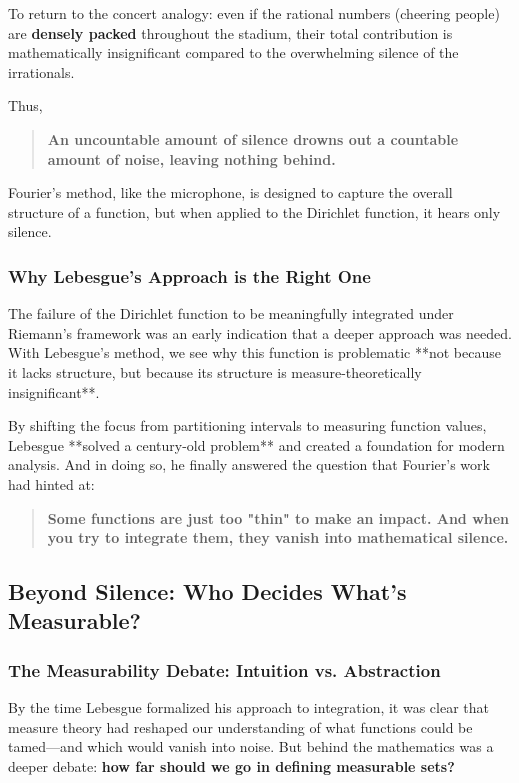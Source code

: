 To return to the concert analogy: even if the rational numbers (cheering people) are \textbf{densely packed} throughout the stadium, their total contribution is mathematically insignificant compared to the overwhelming silence of the irrationals.

Thus,  

\begin{quote}
\textbf{An uncountable amount of silence drowns out a countable amount of noise, leaving nothing behind.}  
\end{quote}

Fourier’s method, like the microphone, is designed to capture the overall structure of a function, but when applied to the Dirichlet function, it hears only silence.



\subsubsection{Why Lebesgue’s Approach is the Right One}

The failure of the Dirichlet function to be meaningfully integrated under Riemann’s framework was an early indication that a deeper approach was needed. With Lebesgue’s method, we see why this function is problematic **not because it lacks structure, but because its structure is measure-theoretically insignificant**.

By shifting the focus from partitioning intervals to measuring function values, Lebesgue **solved a century-old problem** and created a foundation for modern analysis. And in doing so, he finally answered the question that Fourier's work had hinted at:

\begin{quote}
\textbf{Some functions are just too "thin" to make an impact. And when you try to integrate them, they vanish into mathematical silence.}
\end{quote}


\subsection{Beyond Silence: Who Decides What’s Measurable?}

\subsubsection{The Measurability Debate: Intuition vs. Abstraction}

By the time Lebesgue formalized his approach to integration, it was clear that measure theory had reshaped our understanding of what functions could be tamed—and which would vanish into noise. But behind the mathematics was a deeper debate: \textbf{how far should we go in defining measurable sets?}

